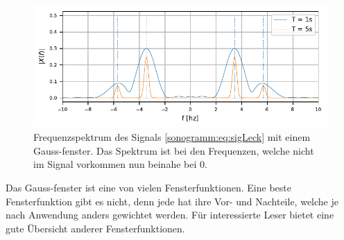 \begin{figure}
    \centering
    \includegraphics{papers/sonogramm/images/twoHarmGauss.pdf}
    \caption{Frequenzspektrum des Signals \eqref{sonogramm:eq:sigLeck} mit
    einem Gauss-fenster. Das Spektrum ist bei den Frequenzen, welche nicht im Signal vorkommen
    nun beinahe bei 0.
    \label{sonogramm:twoHarmGauss}
    }
\end{figure}

Das Gauss-fenster ist eine von vielen Fensterfunktionen. 
Eine beste Fensterfunktion gibt es nicht, denn jede hat ihre Vor- und Nachteile, welche
je nach Anwendung anders gewichtet werden.
Für interessierte Leser bietet \cite{sonogramm:wikiWin} eine 
gute Übersicht anderer Fensterfunktionen.

